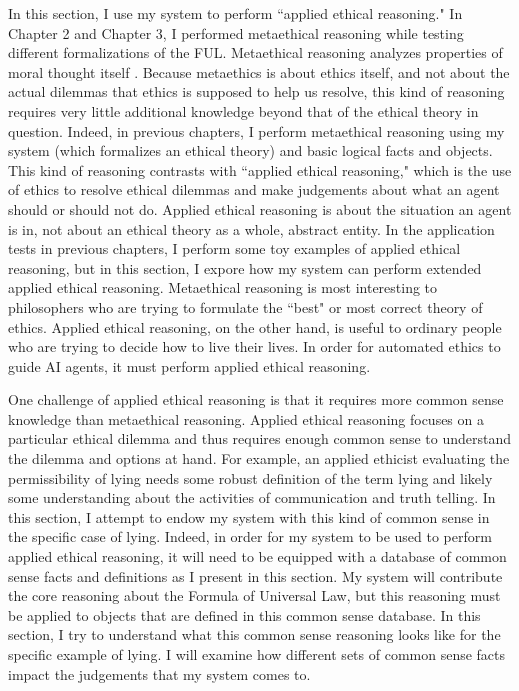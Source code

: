 %
\begin{isabellebody}%
%
%
\isadelimtheory
%
\endisadelimtheory
%
\isatagtheory
%
\endisatagtheory
{\isafoldtheory}%
%
\isadelimtheory
%
\endisadelimtheory
%
\isadelimdocument
%
\endisadelimdocument
%
\isatagdocument
%
\isamarkuptrue%
%
\endisatagdocument
{\isafolddocument}%
%
\isadelimdocument
%
\endisadelimdocument
%
\begin{isamarkuptext}%
In this section, I use my system to perform ``applied ethical reasoning." In Chapter 2
and Chapter 3, I performed metaethical reasoning while testing different formalizations of the FUL. Metaethical
reasoning analyzes properties of moral thought itself \citep{sepme}. Because metaethics is about ethics itself,
and not about the actual dilemmas that ethics is supposed to help us resolve, this kind of reasoning requires
very little additional knowledge beyond that of the ethical theory in question. Indeed, in previous chapters,
I perform metaethical reasoning using my system (which formalizes an ethical theory) and basic logical
facts and objects. This kind of reasoning contrasts with ``applied ethical reasoning," which is the use of
ethics to resolve ethical dilemmas and make judgements about what an agent should or should not do.
Applied ethical reasoning is about the situation an agent is in, not about an ethical theory as a whole,
abstract entity. In the application tests in previous chapters, I perform some toy examples of applied
ethical reasoning, but in this section, I expore how my system can perform extended applied ethical reasoning.
Metaethical reasoning is most interesting to philosophers who are trying to formulate the ``best" or 
most correct theory of ethics. Applied ethical reasoning, on the other hand, is useful to ordinary people
who are trying to decide how to live their lives. In order for automated ethics to guide AI agents, 
it must perform applied ethical reasoning. 

One challenge of applied ethical reasoning is that it requires more common sense knowledge than metaethical
reasoning. Applied ethical reasoning focuses on a particular ethical dilemma and thus requires enough 
common sense to understand the dilemma and options at hand. For example, an applied ethicist 
evaluating the permissibility of lying needs some robust definition of the term lying and likely some
understanding about the activities of communication and truth telling. In this section, I attempt to
endow my system with this kind of common sense in the specific case of lying. Indeed, in order for my 
system to be used to perform applied ethical reasoning, it will need to be equipped with a database
of common sense facts and definitions as I present in this section. My system will contribute the core
reasoning about the Formula of Universal Law, but this reasoning must be applied to objects that are defined
in this common sense database. In this section, I try to understand what this common sense reasoning looks like
for the specific example of lying. I will examine how different sets of common sense facts impact the 
judgements that my system comes to. 


\end{isamarkuptext}
\end{isabellebody}
